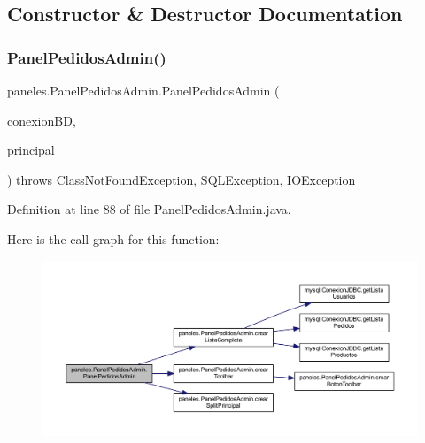 \subsection{Constructor \& Destructor Documentation}
\mbox{\label{classpaneles_1_1_panel_pedidos_admin_abe62da27a8eab1d1ff135f2d0afd1924}} 
\subsubsection{\texorpdfstring{Panel\+Pedidos\+Admin()}{PanelPedidosAdmin()}}
{\footnotesize\ttfamily paneles.\+Panel\+Pedidos\+Admin.\+Panel\+Pedidos\+Admin (\begin{DoxyParamCaption}\item[{\mbox{\hyperlink{classmysql_1_1_conexion_j_d_b_c}{Conexion\+J\+D\+BC}}}]{conexion\+BD,  }\item[{\mbox{\hyperlink{classvistas_1_1_principal}{Principal}}}]{principal }\end{DoxyParamCaption}) throws Class\+Not\+Found\+Exception, S\+Q\+L\+Exception, I\+O\+Exception}



Definition at line 88 of file Panel\+Pedidos\+Admin.\+java.

Here is the call graph for this function\+:
\nopagebreak
\begin{figure}[H]
\begin{center}
\leavevmode
\includegraphics[width=350pt]{classpaneles_1_1_panel_pedidos_admin_abe62da27a8eab1d1ff135f2d0afd1924_cgraph}
\end{center}
\end{figure}


